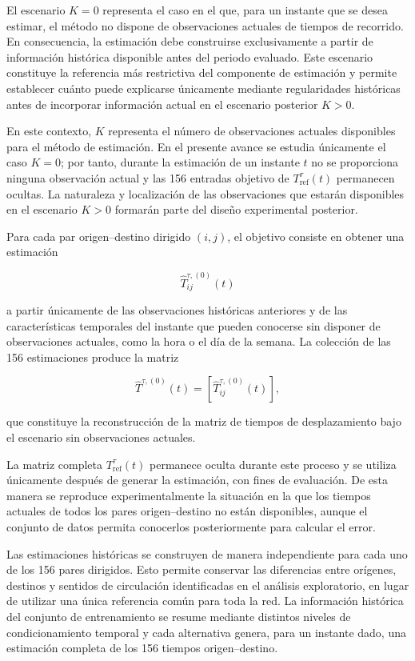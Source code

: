 \documentclass[11pt]{article}
\begin{document}
El escenario $K=0$ representa el caso en el que, para un instante que se desea estimar, el método no dispone de observaciones actuales de tiempos de recorrido. En consecuencia, la estimación debe construirse exclusivamente a partir de información histórica disponible antes del periodo evaluado. Este escenario constituye la referencia más restrictiva del componente de estimación y permite establecer cuánto puede explicarse únicamente mediante regularidades históricas antes de incorporar información actual en el escenario posterior $K>0$.

En este contexto, $K$ representa el número de observaciones actuales disponibles para el método de estimación. En el presente avance se estudia únicamente el caso $K=0$; por tanto, durante la estimación de un instante $t$ no se proporciona ninguna observación actual y las 156 entradas objetivo de $T^\tau_{\mathrm{ref}}(t)$ permanecen ocultas. La naturaleza y localización de las observaciones que estarán disponibles en el escenario $K>0$ formarán parte del diseño experimental posterior.

Para cada par origen--destino dirigido $(i,j)$, el objetivo consiste en obtener una estimación

\[
\widehat{T}^{\tau,(0)}_{ij}(t)
\]

a partir únicamente de las observaciones históricas anteriores y de las características temporales del instante que pueden conocerse sin disponer de observaciones actuales, como la hora o el día de la semana. La colección de las 156 estimaciones produce la matriz

\[
\widehat{T}^{\tau,(0)}(t)
=
\left[
\widehat{T}^{\tau,(0)}_{ij}(t)
\right],
\]

que constituye la reconstrucción de la matriz de tiempos de desplazamiento bajo el escenario sin observaciones actuales.

La matriz completa $T^{\tau}_{\mathrm{ref}}(t)$ permanece oculta durante este proceso y se utiliza únicamente después de generar la estimación, con fines de evaluación. De esta manera se reproduce experimentalmente la situación en la que los tiempos actuales de todos los pares origen--destino no están disponibles, aunque el conjunto de datos permita conocerlos posteriormente para calcular el error.

Las estimaciones históricas se construyen de manera independiente para cada uno de los 156 pares dirigidos. Esto permite conservar las diferencias entre orígenes, destinos y sentidos de circulación identificadas en el análisis exploratorio, en lugar de utilizar una única referencia común para toda la red. La información histórica del conjunto de entrenamiento se resume mediante distintos niveles de condicionamiento temporal y cada alternativa genera, para un instante dado, una estimación completa de los 156 tiempos origen--destino.
\end{document}
